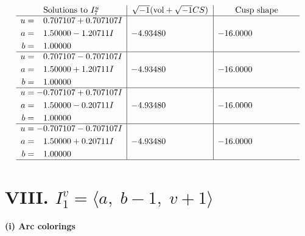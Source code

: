\documentclass[1p]{elsarticle_modified}
\theoremstyle{definition}
\newcommand{\I}{\sqrt{-1}}
\begin{document}
$$\begin{array}{c|c|c}  
\text{Solutions to }I^u_{7}& \I (\text{vol} + \sqrt{-1}CS) & \text{Cusp shape}\\
 \hline 
\begin{aligned}
u &= \phantom{-}0.707107 + 0.707107 I \\
a &= \phantom{-}1.50000 - 1.20711 I \\
b &= \phantom{-}1.00000\phantom{ +0.000000I}\end{aligned}
 & -4.93480\phantom{ +0.000000I} & -16.0000\phantom{ +0.000000I} \\ \hline\begin{aligned}
u &= \phantom{-}0.707107 - 0.707107 I \\
a &= \phantom{-}1.50000 + 1.20711 I \\
b &= \phantom{-}1.00000\phantom{ +0.000000I}\end{aligned}
 & -4.93480\phantom{ +0.000000I} & -16.0000\phantom{ +0.000000I} \\ \hline\begin{aligned}
u &= -0.707107 + 0.707107 I \\
a &= \phantom{-}1.50000 - 0.20711 I \\
b &= \phantom{-}1.00000\phantom{ +0.000000I}\end{aligned}
 & -4.93480\phantom{ +0.000000I} & -16.0000\phantom{ +0.000000I} \\ \hline\begin{aligned}
u &= -0.707107 - 0.707107 I \\
a &= \phantom{-}1.50000 + 0.20711 I \\
b &= \phantom{-}1.00000\phantom{ +0.000000I}\end{aligned}
 & -4.93480\phantom{ +0.000000I} & -16.0000\phantom{ +0.000000I}\\
 \hline 
 \end{array}$$\newpage\newpage\renewcommand{\arraystretch}{1}
\centering \section*{VIII. $I^v_{1}= \langle a,\;b-1,\;v+1 \rangle$}
\flushleft \textbf{(i) Arc colorings}\\
\end{document}
